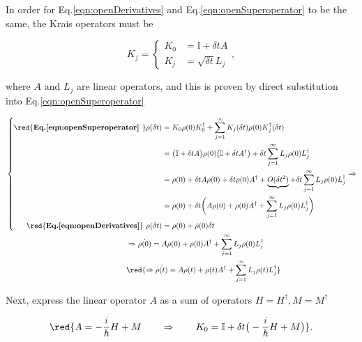 \noindent In order for Eq.\eqref{eqn:openDerivatives} and Eq.\eqref{eqn:openSuperoperator} to be the same, the Krais operators must be

\begin{equation}
K_j = 
\begin{cases}
K_0 & = \mathbb{I} + \delta t A\\
K_j & = \sqrt{\delta t}L_j
\end{cases},
\end{equation}

\noindent where $A$ and $L_j$ are linear operators, and this is proven by direct substitution into Eq.\eqref{eqn:openSuperoperator}

\begin{equation}
\begin{aligned}
&\left\lbrace
\begin{aligned}
\text{\red{\textbf{Eq.\eqref{eqn:openSuperoperator}\ }}} \rho(\delta t) & = K_0\rho(0)K_0^\dagger + \sum_{j=1}^\infty K_j(\delta t)\rho(0)K_j^\dagger(\delta t)\\
& = \big(\mathbb{I} + \delta t A\big)\rho(0)\big(\mathbb{I} + \delta t A^\dagger\big) + \delta t\sum_{j=1}^\infty L_j\rho(0)L_j^\dagger\\
& = \rho(0) + \delta tA\rho(0) + \delta t\rho(0)A^\dagger + \underbrace{O(\delta t^2)} + \delta t\sum_{j=1}^\infty L_j\rho(0)L_j^\dagger\\
& = \rho(0) + \delta t\bigg(A\rho(0) + \rho(0)A^\dagger + \sum_{j=1}^\infty L_j\rho(0)L_j^\dagger\bigg)\\
\text{\red{\textbf{Eq.\eqref{eqn:openDerivatives}}}\ }\rho(\delta t) & = \rho(0) + {\dot{\rho}(0)}\delta t
\end{aligned}
\right. \Rightarrow\\
& \qquad \qquad \qquad \qquad \qquad \qquad \qquad \qquad \Rightarrow {\dot{\rho(0)} = A\rho(0) + \rho(0)A^\dagger + \sum_{j=1}^\infty L_j\rho(0)L_j^\dagger}\\
& \qquad \qquad \qquad \qquad \qquad \qquad \qquad \qquad  \red{\Rightarrow \dot{\rho(t)} = A\rho(t) + \rho(t)A^\dagger + \sum_{j=1}^\infty L_j\rho(t)L_j^\dagger}
\end{aligned}
\label{eqn:openMarkovianDerivation}
\end{equation}

\noindent Next, express the linear operator $A$ as a sum of \textbf{} operators $H=H^\dagger, M = M^\dagger$

\begin{equation}
\red{A = -\frac{i}{\hbar}H+M \qquad \Rightarrow \qquad K_0 = \mathbb{I} + \delta t\big(-\frac{i}{\hbar}H+M\big)}.
\label{eqn:openAValueProposed}
\end{equation}

